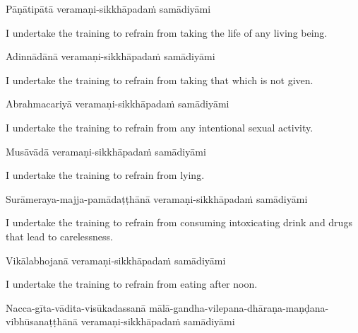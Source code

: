 Pāṇātipātā veramaṇi-sikkhāpadaṁ samādiyāmi

\begin{english-hang}
  I undertake the training to refrain from taking the life of any living being.
\end{english-hang}

Adinnādānā veramaṇi-sikkhāpadaṁ samādiyāmi

\begin{english-hang}
  I undertake the training to refrain from taking that which is not given.
\end{english-hang}

Abrahmacariyā veramaṇi-sikkhāpadaṁ samādiyāmi

\begin{english-hang}
  I undertake the training to refrain from any intentional sexual activity.
\end{english-hang}

Musāvādā veramaṇi-sikkhāpadaṁ samādiyāmi

\begin{english}
  I undertake the training to refrain from lying.
\end{english}

\begin{pali-hang}
  Surāmeraya-majja-pamādaṭṭhānā veramaṇi-sikkhāpadaṁ samādiyāmi
\end{pali-hang}

\begin{english-hang}
  I undertake the training to refrain from consuming intoxicating drink and drugs that\hyperlink{endnote141-appendix}{\hypertarget{endnote141-body}{}}
  lead to carelessness.
\end{english-hang}

Vikālabhojanā veramaṇi-sikkhāpadaṁ samādiyāmi

\begin{english}
  I undertake the training to refrain from eating after noon.\hyperlink{endnote142-appendix}{\hypertarget{endnote142-body}{}}
\end{english}

\begin{pali-hang}
  Nacca-gīta-vādita-visūkadassanā mālā-gandha-vilepana-dhāraṇa-maṇḍana-vibhūsanaṭṭhānā veramaṇi-sikkhāpadaṁ samādiyāmi
\end{pali-hang}

